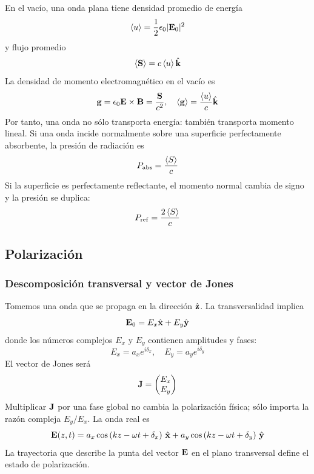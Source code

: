 \documentclass[]{article}
\numberwithin{equation}{section}
\begin{document}
En el vacío, una onda plana tiene densidad promedio de energía
\begin{equation*}
	\left\langle u \right\rangle = \frac{1}{2}\epsilon_{0}|\mathbf{E}_0|^2
\end{equation*}
y flujo promedio
\begin{equation*}
	\left\langle \mathbf{S} \right\rangle = c\left\langle u \right\rangle\hat{\mathbf{k}}
\end{equation*}
La densidad de momento electromagnético en el vacío es
\begin{equation}
	\mathbf{g} = \epsilon_{0} \mathbf{E}\times\mathbf{B} = \frac{\mathbf{S}}{c^2}, \quad \left\langle \mathbf{g} \right\rangle = \frac{\left\langle u \right\rangle}{c} \hat{\mathbf{k}}
\end{equation}
Por tanto, una onda no sólo transporta energía: también transporta momento lineal. Si una onda incide normalmente sobre una superficie perfectamente absorbente, la presión de radiación es
\begin{equation}
	P_\mathrm{abs} = \frac{\left\langle S \right\rangle}{c}
\end{equation}
Si la superficie es perfectamente reflectante, el momento normal cambia de signo y la presión se duplica:
\begin{equation}
	P_\mathrm{ref} = \frac{2 \left\langle S \right\rangle}{c}
\end{equation}

\subsection{Polarización}
\subsubsection{Descomposición transversal y vector de Jones}
Tomemos una onda que se propaga en la dirección $\hat{\mathbf{z}}$. La transversalidad implica
\begin{equation*}
	\mathbf{E}_0 = E_x\hat{\mathbf{x}} + E_y\hat{\mathbf{y}}
\end{equation*}
donde los números complejos $E_x$ y $E_y$ contienen amplitudes y fases:
\begin{equation*}
	E_x = a_x e^{i\delta_x}, \quad E_y = a_y e^{i\delta_y}
\end{equation*}
El vector de Jones será
\begin{equation}
	\mathbf{J} = \begin{pmatrix}
		E_x\\
		E_y
	\end{pmatrix}
\end{equation}
Multiplicar $\mathbf{J}$ por una fase global no cambia la polarización física; sólo importa la razón compleja $E_y/E_x$. La onda real es
\begin{equation}
	\mathbf{E}(z,t) = a_x \cos\left(kz - \omega t + \delta_x\right) \, \hat{\mathbf{x}} +  a_y \cos\left(kz - \omega t + \delta_y\right) \, \hat{\mathbf{y}} \label{E_en_z}
\end{equation}
La trayectoria que describe la punta del vector $\mathbf{E}$ en el plano transversal define el estado de polarización.
\end{document}
